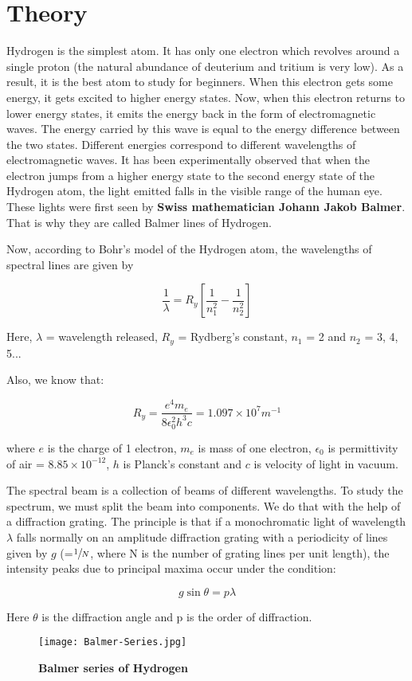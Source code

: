 \section{Theory}

Hydrogen is the simplest atom. It has only one electron which revolves around a single proton (the natural abundance of deuterium and tritium is very low). As a result, it is the best atom to study for beginners. When this electron gets some energy, it gets excited to higher energy states. Now, when this electron returns to lower energy states, it emits the energy back in the form of electromagnetic waves. The energy carried by this wave is equal to the energy difference between the two states. Different energies correspond to different wavelengths of electromagnetic waves. It has been experimentally observed that when the electron jumps from a higher energy state to the second energy state of the Hydrogen atom, the light emitted falls in the visible range of the human eye. These lights were first seen by \textbf{Swiss mathematician Johann Jakob Balmer}. That is why they are called Balmer lines of Hydrogen.

Now, according to Bohr's model of the Hydrogen atom, the wavelengths of spectral lines are given by

\begin{equation}
    \frac{1}{\lambda} = R_y\left[\frac{1}{n_1^2}-\frac{1}{n_2^2} \right]
    \label{eqn:1}
\end{equation}

Here, $\lambda$ = wavelength released, $R_y$ = Rydberg’s constant, $n_1$ = 2 and $n_2$ = 3, 4, 5...

\vspace{5mm}

Also, we know that:

$$R_y = \frac{e^4m_e}{8\epsilon_0^2h^3c} = 1.097 \times 10^7 m^{-1}$$

where $e$ is the charge of 1 electron, $m_e$ is mass of one electron, $\epsilon_0$ is permittivity of air = $8.85 \times 10^{-12}$, $h$ is Planck's constant and $c$ is velocity of light in vacuum.

\vspace{5mm}
The spectral beam is a collection of beams of different wavelengths. To study the spectrum, we must split the beam into components. We do that with the help of a diffraction grating. The principle is that if a monochromatic light of wavelength $\lambda$ falls normally on an amplitude diffraction grating with a periodicity of lines given by $g$ (=$\sfrac{1}{N}$, where N is the number of grating lines per unit length), the intensity peaks due to principal maxima occur under the condition:

\begin{equation}
    g\sin\theta = p\lambda
    \label{eqn:2}
\end{equation}

Here $\theta$ is the diffraction angle and p  is the order of diffraction.

\begin{figure}[H]
    \centering
    \texttt{[image: Balmer-Series.jpg]}
    \caption{\textbf{Balmer series of Hydrogen}}
    \label{fig:1}
\end{figure}